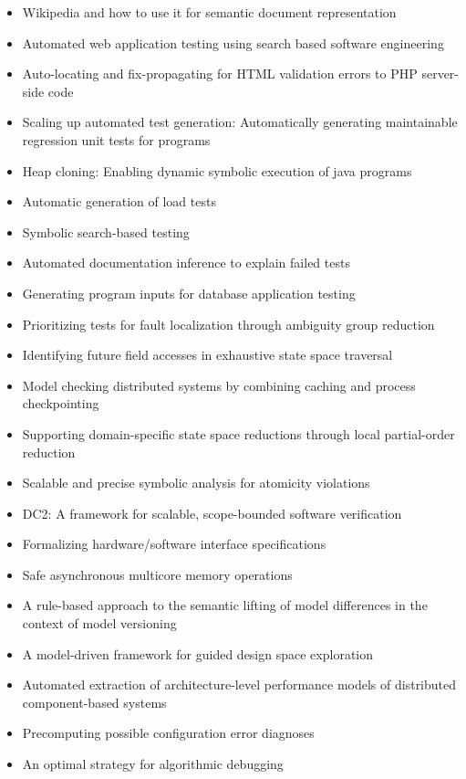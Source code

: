 {\small
\begin{itemize}[itemsep=-1ex]
  \item Wikipedia and how to use it for semantic document representation
  \item Automated web application testing using search based software engineering
  \item Auto-locating and fix-propagating for HTML validation errors to PHP server-side code
  \item Scaling up automated test generation: Automatically generating maintainable regression unit tests for programs
  \item Heap cloning: Enabling dynamic symbolic execution of java programs
  \item Automatic generation of load tests
  \item Symbolic search-based testing
  \item Automated documentation inference to explain failed tests
  \item Generating program inputs for database application testing
  \item Prioritizing tests for fault localization through ambiguity group reduction
  \item Identifying future field accesses in exhaustive state space traversal
  \item Model checking distributed systems by combining caching and process checkpointing
  \item Supporting domain-specific state space reductions through local partial-order reduction
  \item Scalable and precise symbolic analysis for atomicity violations
  \item DC2: A framework for scalable, scope-bounded software verification
  \item Formalizing hardware/software interface specifications
  \item Safe asynchronous multicore memory operations
  \item A rule-based approach to the semantic lifting of model differences in the context of model versioning
  \item A model-driven framework for guided design space exploration
  \item Automated extraction of architecture-level performance models of distributed component-based systems
  \item Precomputing possible configuration error diagnoses
  \item An optimal strategy for algorithmic debugging

\end{itemize}}
